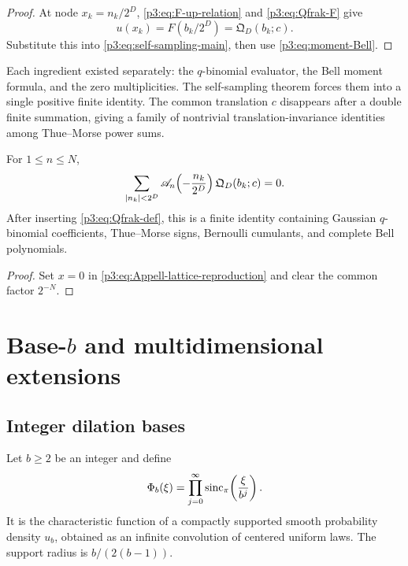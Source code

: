 \documentclass[11pt,oneside]{article}
\numberwithin{equation}{section}
\theoremstyle{definition}
\theoremstyle{remark}
\newcommand{\abs}[1]{\left|#1\right|}
\begin{document}
\begin{proof}
At node $x_k=n_k/2^D$, \eqref{p3:eq:F-up-relation} and \eqref{p3:eq:Qfrak-F} give
\[
 u(x_k)=F(b_k/2^D)=\mathfrak Q_D(b_k;c).
\]
Substitute this into \eqref{p3:eq:self-sampling-main}, then use \eqref{p3:eq:moment-Bell}.
\end{proof}

\begin{remark}
Each ingredient existed separately: the $q$-binomial evaluator, the Bell moment formula, and the zero multiplicities.  The self-sampling theorem forces them into a single positive finite identity.  The common translation $c$ disappears after a double finite summation, giving a family of nontrivial translation-invariance identities among Thue--Morse power sums.
\end{remark}

\begin{corollary}
\label{p3:cor:q-Appell-cancellation}
For $1\le n\le N$,
\begin{equation}
 \sum_{\abs{n_k}<2^D}
 \Acal_n\!\left(-\frac{n_k}{2^D}\right)
 \mathfrak Q_D(b_k;c)=0.
 \label{p3:eq:q-Appell-cancellation}
\end{equation}
After inserting \eqref{p3:eq:Qfrak-def}, this is a finite identity containing Gaussian $q$-binomial coefficients, Thue--Morse signs, Bernoulli cumulants, and complete Bell polynomials.
\end{corollary}

\begin{proof}
Set $x=0$ in \eqref{p3:eq:Appell-lattice-reproduction} and clear the common factor $2^{-N}$.
\end{proof}

\section{Base-$b$ and multidimensional extensions}
\label{p3:sec:extensions}

\subsection{Integer dilation bases}

Let $b\ge2$ be an integer and define
\begin{equation}
 \Phi_b(\xi)=\prod_{j=0}^{\infty}
 \operatorname{sinc}_{\pi}\!\left(\frac{\xi}{b^j}\right).
 \label{p3:eq:Phi-b}
\end{equation}
It is the characteristic function of a compactly supported smooth probability density $u_b$, obtained as an infinite convolution of centered uniform laws.  The support radius is $b/(2(b-1))$.
\end{document}
